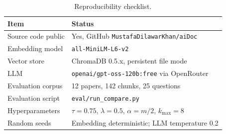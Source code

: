 \documentclass[conference]{IEEEtran}
\begin{document}
\begin{table}[h]
  \caption{Reproducibility checklist.}
  \label{tab:repro}
  \centering
  \renewcommand{\arraystretch}{1.2}
  \begin{tabular}{p{3.5cm}p{4.5cm}}
    \toprule
    \textbf{Item} & \textbf{Status}\\
    \midrule
    Source code public      & Yes, GitHub \texttt{MustafaDilawarKhan/aiDoc}\\
    Embedding model         & \texttt{all-MiniLM-L6-v2}\\
    Vector store            & ChromaDB 0.5.x, persistent file mode\\
    LLM                     & \texttt{openai/gpt-oss-120b:free} via OpenRouter\\
    Evaluation corpus       & 12 papers, 142 chunks, 25 questions\\
    Evaluation script       & \texttt{eval/run\_compare.py}\\
    Hyperparameters         & $\tau{=}0.75$, $\lambda{=}0.5$, $\alpha{=}m/2$,
                              $k_{\max}{=}8$\\
    Random seeds            & Embedding deterministic; LLM temperature 0.2\\
    \bottomrule
  \end{tabular}
\end{table}
\end{document}
